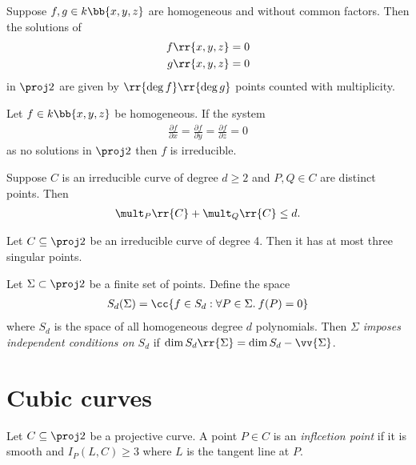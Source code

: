 \documentclass{article}
\begin{document}
\begin{theorem}[Bezout]
  Suppose $f,g\in k\bb{x,y,z}$ are homogeneous and without common factors. Then the solutions
  of
  \begin{align*}
    f\rr{x,y,z}&=0\\
    g\rr{x,y,z}&=0
  \end{align*}
  in $\proj 2$ are given by $\rr{\deg f}\rr{\deg g}$ points counted with multiplicity.
\end{theorem}

\begin{proposition}
  Let $f\in k\bb{x,y,z}$ be homogeneous. If the system
  \begin{align*}
    \frac{\partial f}{\partial x}=\frac{\partial f}{\partial y}=\frac{\partial f}{\partial z}=0
  \end{align*}
  as no solutions in $\proj 2$ then $f$ is irreducible.
\end{proposition}

\begin{proposition}
  Suppose $C$ is an irreducible curve of degree $d\geq 2$ and $P,Q\in C$ are distinct points.
  Then
  \begin{align*}
    \mult_P\rr{C}+\mult_Q\rr{C} \leq d.
  \end{align*}
\end{proposition}

\begin{proposition}
  Let $C\subseteq\proj 2$ be an irreducible curve of degree 4. Then it has at most three
  singular points.
\end{proposition}

\begin{definition}
  Let $\Sigma\subset\proj 2$ be a finite set of points. Define the space
  \begin{align*}
    S_d(\Sigma) = \cc{f \in S_d : \forall P\in\Sigma.\: f(P)=0}
  \end{align*}
  where $S_d$ is the space of all homogeneous degree $d$ polynomials. Then $\Sigma$
  \emph{imposes independent conditions on $S_d$} if
  $\dim S_d\rr{\Sigma} = \dim S_d - \vv{\Sigma}$.
\end{definition}


\section{Cubic curves}

\begin{definition}
  Let $C\subseteq\proj 2$ be a projective curve. A point $P\in C$ is an
  \emph{inflcetion point} if it is smooth and $I_P(L,C)\geq 3$ where $L$ is
  the tangent line at $P$.
\end{definition}
\end{document}
